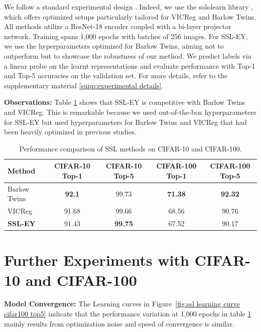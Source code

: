 We follow a standard experimental design \citep{tong2023emp}. Indeed, we use the sololearn library \citep{da2022solo}, which offers optimized setups particularly tailored for VICReg and Barlow Twins. All methods utilize a ResNet-18 encoder coupled with a bi-layer projector network. Training spans 1,000 epochs with batches of 256 images. For SSL-EY, we use the hyperparameters optimized for Barlow Twins, aiming not to outperform but to showcase the robustness of our method.
We predict labels via a linear probe on the learnt representations and evaluate performance with Top-1 and Top-5 accuracies on the validation set. For more details, refer to the supplementary material \ref{supp:experimental details}.

\textbf{Observations:} Table \ref{tab:selfsup} shows that SSL-EY is competitive with Barlow Twins and VICReg. This is remarkable because we used out-of-the-box hyperparameters for SSL-EY but used hyperparameters for Barlow Twins and VICReg that had been heavily optimized in previous studies.

\begin{table}
    \centering
    \begin{tabular}{lcccc}
        \hline
        Method          & CIFAR-10 Top-1 & CIFAR-10 Top-5 & CIFAR-100 Top-1 & CIFAR-100 Top-5 \\
        \hline
        Barlow Twins    & \textbf{92.1}  & 99.73          & \textbf{71.38}  & \textbf{92.32}  \\
        VICReg          & 91.68          & 99.66          & 68.56           & 90.76           \\
        \textbf{SSL-EY} & 91.43          & \textbf{99.75} & 67.52           & 90.17           \\
        \hline
    \end{tabular}
    \caption{Performance comparison of SSL methods on CIFAR-10 and CIFAR-100.}
    \label{tab:selfsup}
\end{table}


\section{Further Experiments with CIFAR-10 and CIFAR-100}\label{sec:experiments}

\textbf{Model Convergence:} The Learning curves in Figure~\ref{fig:ssl learning curve cifar100 top5} indicate that the performance variation at 1,000 epochs in table \ref{tab:selfsup} mainly results from optimization noise and speed of convergence is similar.


